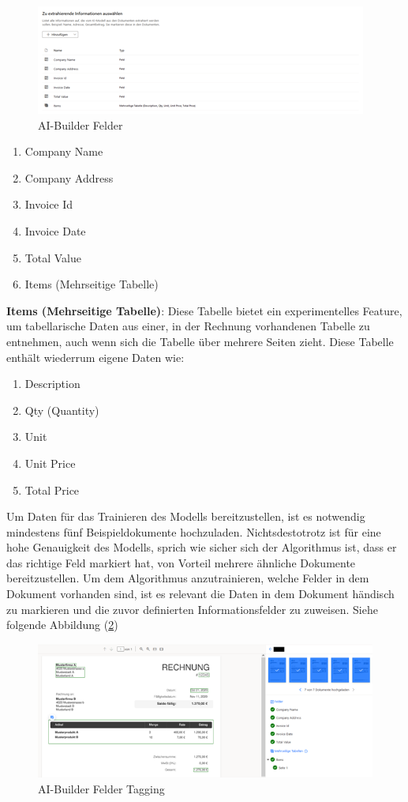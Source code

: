 \begin{figure}[h]
    \centering
    \includegraphics[scale=0.9]{sections/cloud-computing/images/ai-builder-fields.png}
    \caption{AI-Builder Felder}
    \label{fig:ai-builder-fields-figure}
\end{figure}

\begin{enumerate}
    \item Company Name
    \item Company Address
    \item Invoice Id
    \item Invoice Date
    \item Total Value
    \item Items (Mehrseitige Tabelle)
\end{enumerate}

\textbf{Items (Mehrseitige Tabelle)}: Diese Tabelle bietet ein experimentelles Feature, um tabellarische Daten aus einer, in der Rechnung vorhandenen Tabelle zu entnehmen, auch wenn sich die Tabelle über mehrere Seiten zieht. Diese Tabelle enthält wiederrum eigene Daten wie:

\begin{enumerate}
    \item Description
    \item Qty (Quantity)
    \item Unit
    \item Unit Price
    \item Total Price
\end{enumerate}

Um Daten für das Trainieren des Modells bereitzustellen, ist es notwendig mindestens fünf Beispieldokumente hochzuladen. Nichtsdestotrotz ist für eine hohe Genauigkeit des Modells, sprich wie sicher sich der Algorithmus ist, dass er das richtige Feld markiert hat, von Vorteil mehrere ähnliche Dokumente bereitzustellen. 
Um dem Algorithmus anzutrainieren, welche Felder in dem Dokument vorhanden sind, ist es relevant die Daten in dem Dokument händisch zu markieren und die zuvor definierten Informationsfelder zu zuweisen. Siehe folgende Abbildung (\ref{fig:ai-builder-tagging-figure})

\begin{figure}[h]
    \centering
    \includegraphics[scale=0.9]{sections/cloud-computing/images/ai-builder-tagging.png}
    \caption{AI-Builder Felder Tagging}
    \label{fig:ai-builder-tagging-figure}
\end{figure}